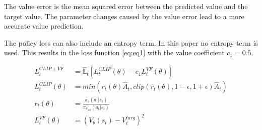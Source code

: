 The value error is the mean squared error between the predicted value and the target value. The parameter changes caused by the value error lead to a more accurate value prediction.

The policy loss can also include an entropy term. In this paper no entropy term is used. This results in the loss function \eqref{eq:eq1} with the value coefficient $c_1 = 0.5$.

\begin{align*}
    L_t^{CLIP + VF} &= \hat{\mathbb{E}}_t [L_t^{CLIP}(\theta) - c_1 L_t^{VF}(\theta)] \label{eq:eq1}\tag{PPO Loss} \\
    L_t^{CLIP}(\theta) &= min(r_t(\theta)\hat{A}_t, clip(r_t(\theta), 1-\epsilon, 1+\epsilon)\hat{A}_t) \label{eq:eq2}\tag{Surrogate Objective}\\
    r_t(\theta) &= \frac{\pi_\theta(a_t|s_t)}{\pi_{\theta_{old}}(a_t|s_t)} \label{eq:eq3}\tag{Ratio}\\
    L_t^{VF}(\theta) &= (V_\theta (s_t) - V_t^{targ})^2 \label{eq:eq4}\tag{Value Error}
\end{align*}

